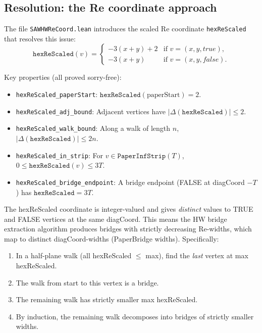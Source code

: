 \begin{lemma}
\begin{enumerate}
\subsection{Resolution: the Re coordinate approach}

The file \texttt{SAWHWReCoord.lean} introduces the scaled Re coordinate
\texttt{hexReScaled} that resolves this issue:
\[
  \texttt{hexReScaled}(v) =
  \begin{cases}
    -3(x+y) + 2 & \text{if } v = (x,y,\mathit{true}), \\
    -3(x+y) & \text{if } v = (x,y,\mathit{false}).
  \end{cases}
\]

Key properties (all proved sorry-free):
\begin{itemize}
  \item \texttt{hexReScaled\_paperStart}: $\texttt{hexReScaled}(\text{paperStart}) = 2$.
  \item \texttt{hexReScaled\_adj\_bound}: Adjacent vertices have $|\Delta(\texttt{hexReScaled})| \leq 2$.
  \item \texttt{hexReScaled\_walk\_bound}: Along a walk of length $n$,
    $|\Delta(\texttt{hexReScaled})| \leq 2n$.
  \item \texttt{hexReScaled\_in\_strip}: For $v \in \texttt{PaperInfStrip}(T)$,
    $0 \leq \texttt{hexReScaled}(v) \leq 3T$.
  \item \texttt{hexReScaled\_bridge\_endpoint}: A bridge endpoint
    (FALSE at diagCoord $-T$) has $\texttt{hexReScaled} = 3T$.
\end{itemize}

The hexReScaled coordinate is integer-valued and gives \emph{distinct}
values to TRUE and FALSE vertices at the same diagCoord. This means
the HW bridge extraction algorithm produces bridges with strictly
decreasing Re-widths, which map to distinct diagCoord-widths (PaperBridge
widths).  Specifically:

\begin{enumerate}
  \item In a half-plane walk (all hexReScaled $\leq$ max), find the
    \emph{last} vertex at max hexReScaled.
  \item The walk from start to this vertex is a bridge.
  \item The remaining walk has strictly smaller max hexReScaled.
  \item By induction, the remaining walk decomposes into bridges of
    strictly smaller widths.
\end{enumerate}


\end{enumerate}
\end{lemma}
